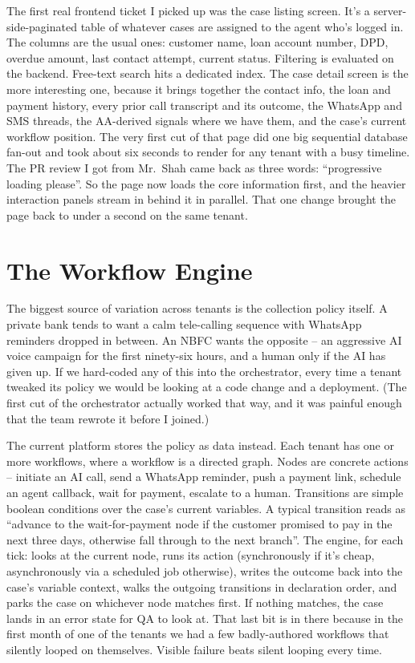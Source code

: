 The first real frontend ticket I picked up was the case listing screen. It's a server-side-paginated table of whatever cases are assigned to the agent who's logged in. The columns are the usual ones: customer name, loan account number, DPD, overdue amount, last contact attempt, current status. Filtering is evaluated on the backend. Free-text search hits a dedicated index. The case detail screen is the more interesting one, because it brings together the contact info, the loan and payment history, every prior call transcript and its outcome, the WhatsApp and SMS threads, the AA-derived signals where we have them, and the case's current workflow position. The very first cut of that page did one big sequential database fan-out and took about six seconds to render for any tenant with a busy timeline. The PR review I got from Mr.~Shah came back as three words: ``progressive loading please''. So the page now loads the core information first, and the heavier interaction panels stream in behind it in parallel. That one change brought the page back to under a second on the same tenant.

\section{The Workflow Engine}
\label{sec:workflow}
The biggest source of variation across tenants is the collection policy itself. A private bank tends to want a calm tele-calling sequence with WhatsApp reminders dropped in between. An NBFC wants the opposite -- an aggressive AI voice campaign for the first ninety-six hours, and a human only if the AI has given up. If we hard-coded any of this into the orchestrator, every time a tenant tweaked its policy we would be looking at a code change and a deployment. (The first cut of the orchestrator actually worked that way, and it was painful enough that the team rewrote it before I joined.)

The current platform stores the policy as data instead. Each tenant has one or more workflows, where a workflow is a directed graph. Nodes are concrete actions -- initiate an AI call, send a WhatsApp reminder, push a payment link, schedule an agent callback, wait for payment, escalate to a human. Transitions are simple boolean conditions over the case's current variables. A typical transition reads as ``advance to the wait-for-payment node if the customer promised to pay in the next three days, otherwise fall through to the next branch''. The engine, for each tick: looks at the current node, runs its action (synchronously if it's cheap, asynchronously via a scheduled job otherwise), writes the outcome back into the case's variable context, walks the outgoing transitions in declaration order, and parks the case on whichever node matches first. If nothing matches, the case lands in an error state for QA to look at. That last bit is in there because in the first month of one of the tenants we had a few badly-authored workflows that silently looped on themselves. Visible failure beats silent looping every time.

